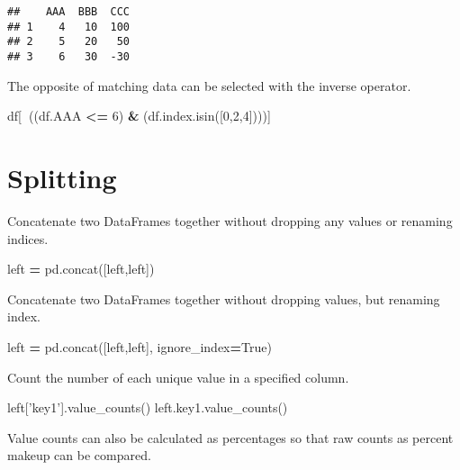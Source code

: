 \documentclass[]{book}
\newenvironment{Shaded}{\begin{snugshade}}{\end{snugshade}}
\newcommand{\DecValTok}[1]{\textcolor[rgb]{0.00,0.00,0.81}{#1}}
\newcommand{\StringTok}[1]{\textcolor[rgb]{0.31,0.60,0.02}{#1}}
\newcommand{\VariableTok}[1]{\textcolor[rgb]{0.00,0.00,0.00}{#1}}
\newcommand{\OperatorTok}[1]{\textcolor[rgb]{0.81,0.36,0.00}{\textbf{#1}}}
\newcommand{\NormalTok}[1]{#1}
\begin{document}
\begin{verbatim}
##    AAA  BBB  CCC
## 1    4   10  100
## 2    5   20   50
## 3    6   30  -30
\end{verbatim}

The opposite of matching data can be selected with the inverse operator.

\begin{Shaded}
\begin{Highlighting}[]
\NormalTok{df[}\OperatorTok{~}\NormalTok{((df.AAA }\OperatorTok{<=} \DecValTok{6}\NormalTok{) }\OperatorTok{&}\NormalTok{ (df.index.isin([}\DecValTok{0}\NormalTok{,}\DecValTok{2}\NormalTok{,}\DecValTok{4}\NormalTok{])))]}
\end{Highlighting}
\end{Shaded}

\section{Splitting}\label{splitting}

Concatenate two DataFrames together without dropping any values or
renaming indices.

\begin{Shaded}
\begin{Highlighting}[]
\NormalTok{left }\OperatorTok{=}\NormalTok{ pd.concat([left,left])}
\end{Highlighting}
\end{Shaded}

Concatenate two DataFrames together without dropping values, but
renaming index.

\begin{Shaded}
\begin{Highlighting}[]
\NormalTok{left }\OperatorTok{=}\NormalTok{ pd.concat([left,left], ignore_index}\OperatorTok{=}\VariableTok{True}\NormalTok{)}
\end{Highlighting}
\end{Shaded}

Count the number of each unique value in a specified column.

\begin{Shaded}
\begin{Highlighting}[]
\NormalTok{left[}\StringTok{'key1'}\NormalTok{].value_counts()}
\NormalTok{left.key1.value_counts()}
\end{Highlighting}
\end{Shaded}

Value counts can also be calculated as percentages so that raw counts as
percent makeup can be compared.
\end{document}
